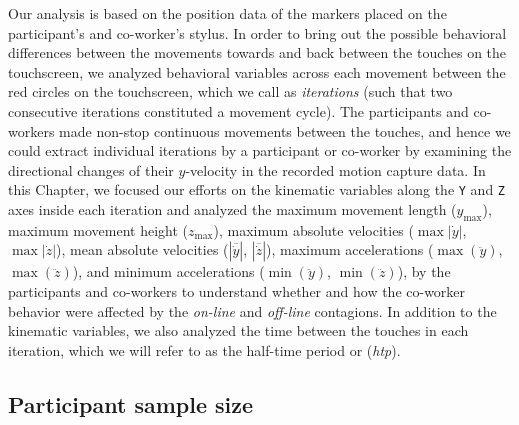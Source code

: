 Our analysis is based on the position data of the markers placed on the participant's and co-worker's stylus. In order to bring out the possible behavioral differences between the movements towards and back between the touches on the touchscreen, we analyzed behavioral variables across each movement between the red circles on the touchscreen, which we call as \textit{iterations} (such that two consecutive iterations constituted a movement cycle). The participants and co-workers made non-stop continuous movements between the touches, and hence we could extract individual iterations by a participant or co-worker by examining the directional changes of their $y$-velocity in the recorded motion capture data. In this Chapter, we focused our efforts on the kinematic variables along the \texttt{Y} and \texttt{Z} axes inside each iteration and analyzed the maximum movement length ($y_{\max}$), maximum movement height ($z_{\max}$), maximum absolute velocities ($\max|\dot{y}|$, $\max|\dot{z}|$), mean absolute velocities ($|\overline{\dot{y}}|$, $|\overline{\dot{z}}|$), maximum accelerations ($\max(\ddot{y})$, $\max(\ddot{z})$), and minimum accelerations ($\min(\ddot{y})$, $\min(\ddot{z})$), by the participants and co-workers to understand whether and how the co-worker behavior were affected by the \textit{on-line} and \textit{off-line} contagions. In addition to the kinematic variables, we also analyzed the time between the touches in each iteration, which we will refer to as the half-time period or ({\it htp}).

\subsection{Participant sample size}\label{roman sample size}


